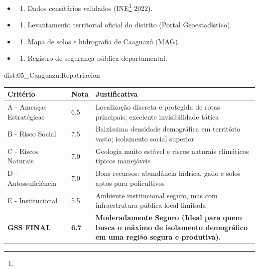 {\begin{itemize}
\tightlist
\item
  \begin{enumerate}
  \def\labelenumi{\arabic{enumi})}
  \tightlist
  \item
    Dados censitários validados (INE\footnote{\fineINE} 2022).
  \end{enumerate}
\item
  \begin{enumerate}
  \def\labelenumi{\arabic{enumi})}
  \setcounter{enumi}{1}
  \tightlist
  \item
    Levantamento territorial oficial do distrito (Portal
    Geoestadístico).
  \end{enumerate}
\item
  \begin{enumerate}
  \def\labelenumi{\arabic{enumi})}
  \setcounter{enumi}{2}
  \tightlist
  \item
    Mapa de solos e hidrografia de Caaguazú (MAG).
  \end{enumerate}
\item
  \begin{enumerate}
  \def\labelenumi{\arabic{enumi})}
  \setcounter{enumi}{3}
  \tightlist
  \item
    Registro de segurança pública departamental.
  \end{enumerate}
\end{itemize}}{dist:05_Caaguazu:Repatriacion}
\begin{table}[ht!]
\small \begin{tabular}{p{3.0cm}p{0.8cm}p{6.0cm}} \toprule
\textbf{Critério} & \textbf{Nota} & \textbf{Justificativa} \\ \midrule
A - Ameaças Estratégicas & 6.5 & Localização discreta e protegida de rotas principais; excelente invisibilidade tática \\
B - Risco Social & 7.5 & Baixíssima densidade demográfica em território vasto; isolamento social superior \\
C - Riscos Naturais & 7.0 & Geologia muito estável e riscos naturais climáticos típicos manejáveis \\
D - Autossuficiência & 7.0 & Bons recursos: abundância hídrica, gado e solos aptos para policultivos \\
E - Institucional & 5.5 & Ambiente institucional seguro, mas com infraestrutura pública local limitada \\
\midrule \textbf{GSS FINAL} & \textbf{6.7} & \textbf{Moderadamente Seguro (Ideal para quem busca o máximo de isolamento demográfico em uma região segura e produtiva).} \\ \bottomrule \end{tabular}
\end{table}
